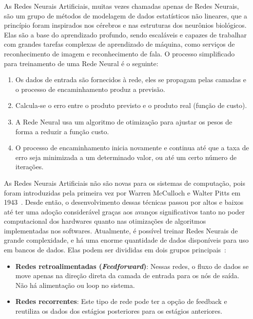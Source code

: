 \documentclass[portugues]{ic-tese}
\begin{document}
As Redes Neurais Artificiais, muitas vezes chamadas apenas de Redes Neurais, são um grupo de métodos de modelagem de dados estatísticos não lineares, que a princípio foram inspirados nos cérebros e nas estruturas dos neurônios biológicos. Elas são a base do aprendizado profundo, sendo escaláveis e capazes de trabalhar com grandes tarefas complexas de aprendizado de máquina, como serviços de reconhecimento de imagem e reconhecimento de fala. O processo simplificado para treinamento de uma Rede Neural é o seguinte:

\begin{enumerate}[label=\textbf{\arabic*.}]
\item Os dados de entrada são fornecidos à rede, eles se propagam pelas camadas e o processo de encaminhamento produz a previsão.
\item Calcula-se o erro entre o produto previsto e o produto real (função de custo).
\item A Rede Neural usa um algoritmo de otimização para ajustar os pesos de forma a reduzir a função custo.
\item O processo de encaminhamento inicia novamente e continua até que a taxa de erro seja minimizada a um determinado valor, ou até um certo número de iterações.
\end{enumerate}

As Redes Neurais Artificiais não são novas para os sistemas de computação, pois foram introduzidas pela primeira vez por Warren McCulloch e Walter Pitts em 1943~\citep{McCulloch_1943}. Desde então, o desenvolvimento dessas técnicas passou por altos e baixos até ter uma adoção considerável graças aos avanços significativos tanto no poder computacional dos hardwares quanto nas otimizações de algoritmos implementadas nos softwares. Atualmente, é possível treinar Redes Neurais de grande complexidade, e há uma enorme quantidade de dados disponíveis para uso em bancos de dados. Elas podem ser divididas em dois grupos principais~\citep{Singh_2009}:

\begin{itemize}
\item \textbf{Redes retroalimentadas (\textit{Feedforward})}: Nessas redes, o fluxo de dados se move apenas na direção direta da camada de entrada para os nós de saída. Não há alimentação ou loop no sistema.
\item \textbf{Redes recorrentes}: Este tipo de rede pode ter a opção de feedback e reutiliza os dados dos estágios posteriores para os estágios anteriores.
\end{itemize}
\end{document}
